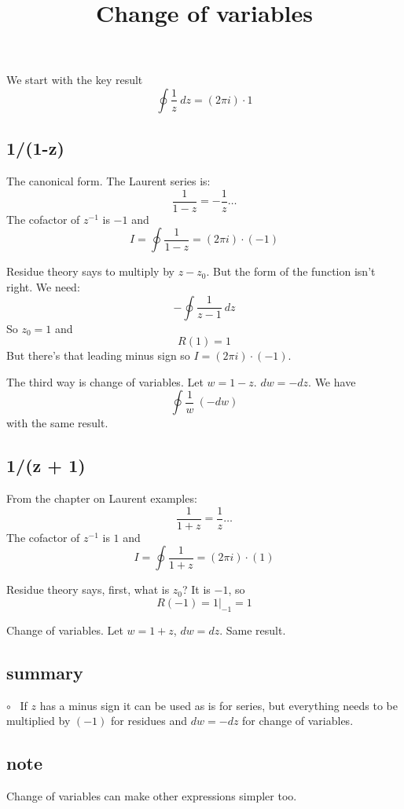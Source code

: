 \documentclass[11pt, oneside]{article}
\title{Change of variables}
\date{}
\begin{document}
\maketitle
\Large


We start with the key result
\[ \oint \frac{1}{z} \ dz = (2 \pi i) \cdot 1 \]

\subsection*{1/(1-z)}
The canonical form.  The Laurent series is:
\[ \frac{1}{1 - z} = - \frac{1}{z} \dots \]
The cofactor of $z^{-1}$ is $-1$ and 
\[ I = \oint \frac{1}{1 - z} = (2 \pi i) \cdot (-1) \]

Residue theory says to multiply by $z - z_0$.  But the form of the function isn't right.  We need:
\[ - \oint \frac{1}{z - 1} \ dz \]
So $z_0 = 1$ and
\[ R(1) = 1 \]
But there's that leading minus sign so $I = (2 \pi i) \cdot (-1)$.

The third way is change of variables.  Let $w = 1 - z$.  $dw = - dz$.  We have
\[ \oint \frac{1}{w} \ (- dw) \]
with the same result.

\subsection*{1/(z + 1)}
From the chapter on Laurent examples:
\[ \frac{1}{1 + z} = \frac{1}{z}  \dots \]
The cofactor of $z^{-1}$ is $1$ and 
\[ I = \oint \frac{1}{1 + z} = (2 \pi i) \cdot (1) \]

Residue theory says, first, what is $z_0$?  It is $-1$, so
\[ R(-1) = 1 \bigg |_{-1} = 1 \]

Change of variables.  Let $w = 1 + z$, $dw = dz$.  Same result.

\subsection*{summary}

$\circ$ \ If $z$ has a minus sign it can be used as is for series, but everything needs to be multiplied by $(-1)$ for residues and $dw = - dz$ for change of variables.

\subsection*{note}
Change of variables can make other expressions simpler too.
\end{document}
